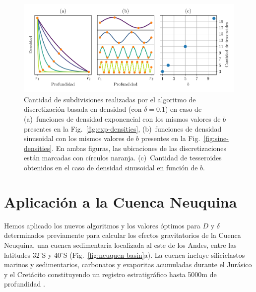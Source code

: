 \begin{figure}
\centering
\includegraphics[width=\linewidth]{figs/tesseroids-variable-density/number-of-tesseroids.pdf}
\caption{
    Cantidad de subdivisiones realizadas por el algoritmo de discretización
    basada en densidad (con $\delta = 0.1$) en caso de
    (a)~funciones de densidad exponencial con los mismos valores de $b$
    presentes en la Fig.~\ref{fig:exp-densities},
    (b)~funciones de densidad sinusoidal con los mismos valores de $b$
    presentes en la Fig.~\ref{fig:sine-densities}.
    En ambas figuras, las ubicaciones de las discretizaciones están marcadas
    con círculos naranja.
    (c)~Cantidad de tesseroides obtenidos en el caso de densidad sinusoidal en
    función de $b$.
}
\label{fig:number-of-tesseroids}
\end{figure}



\section{Aplicación a la Cuenca Neuquina}

Hemos aplicado los nuevos algoritmos y los valores óptimos para $D$
y $\delta$ determinados previamente para calcular los efectos gravitatorios de
la Cuenca Neuquina, una cuenca sedimentaria localizada al este de los Andes,
entre las latitudes 32$^\circ$S y 40$^\circ$S (Fig.~\ref{fig:neuquen-basin}a).
La cuenca incluye siliciclastos marinos y sedimentarios, carbonatos
y evaporitas acumuladas durante el Jurásico y el Cretácito constituyendo un
registro estratigráfico hasta 5000m de profundidad \citep{howell2005}.

